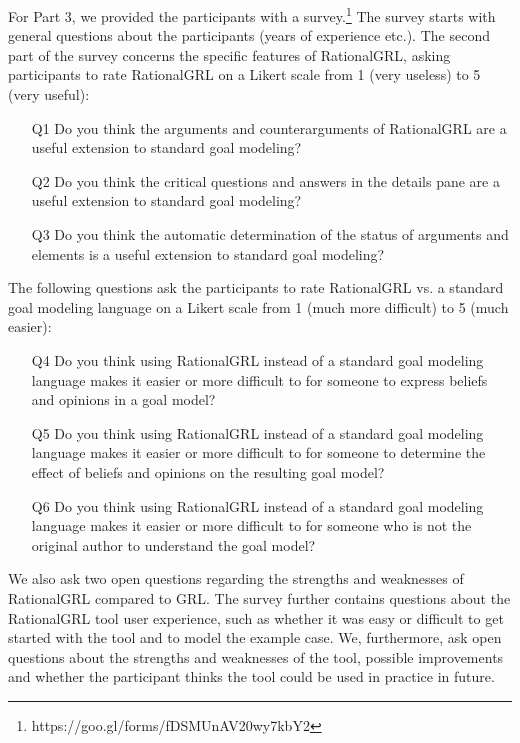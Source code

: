 For Part 3, we provided the participants with a survey.\footnote{https://goo.gl/forms/fDSMUnAV20wy7kbY2} The survey starts with general questions about the participants (years of experience etc.). The second part of the survey concerns the specific features of RationalGRL, asking participants to rate RationalGRL on a Likert scale from 1 (very useless) to 5 (very useful):
\begin{itemize}
\item[Q1] Do you think the arguments and counterarguments of RationalGRL are a useful extension to standard goal modeling?
\item[Q2] Do you think the critical questions and answers in the details pane are a useful extension to standard goal modeling?
\item[Q3] Do you think the automatic determination of the status of arguments and elements is a useful extension to standard goal modeling?
\end{itemize}
The following questions ask the participants to rate RationalGRL vs. a standard goal modeling language on a Likert scale from 1 (much more difficult) to 5 (much easier):
\begin{itemize}
\item[Q4] Do you think using RationalGRL instead of a standard goal modeling language makes it easier or more difficult to for someone to express beliefs and opinions in a goal model?
\item[Q5] Do you think using RationalGRL instead of a standard goal modeling language makes it easier or more difficult to for someone to determine the effect of beliefs and opinions on the resulting goal model?
\item [Q6] Do you think using RationalGRL instead of a standard goal modeling language makes it easier or more difficult to for someone who is not the original author to understand the goal model? 
\end{itemize}
We also ask two open questions regarding the strengths and weaknesses of RationalGRL compared to GRL. The survey further contains questions about the RationalGRL tool user experience, such as whether it was easy or difficult to get started with the tool and to model the example case. We, furthermore, ask open questions about the strengths and weaknesses of the tool, possible improvements and whether the participant thinks the tool could be used in practice in future. 

